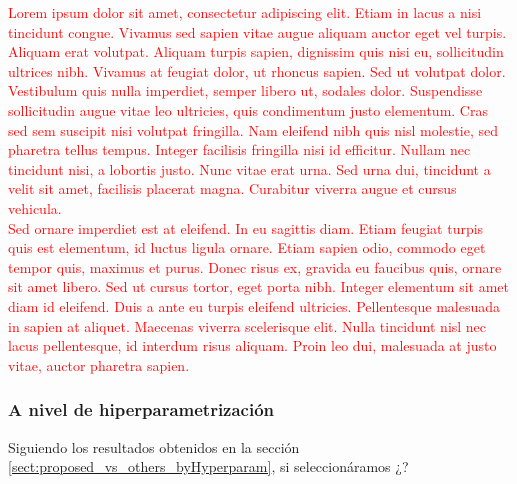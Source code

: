 \documentclass[print, color]{ugrTFG}
\begin{document}
\textcolor{red}{
 Lorem ipsum dolor sit amet, consectetur adipiscing elit. Etiam in lacus a nisi tincidunt congue. Vivamus sed sapien vitae augue aliquam auctor eget vel turpis. Aliquam erat volutpat. Aliquam turpis sapien, dignissim quis nisi eu, sollicitudin ultrices nibh. Vivamus at feugiat dolor, ut rhoncus sapien. Sed ut volutpat dolor. Vestibulum quis nulla imperdiet, semper libero ut, sodales dolor. Suspendisse sollicitudin augue vitae leo ultricies, quis condimentum justo elementum. Cras sed sem suscipit nisi volutpat fringilla. Nam eleifend nibh quis nisl molestie, sed pharetra tellus tempus. Integer facilisis fringilla nisi id efficitur. Nullam nec tincidunt nisi, a lobortis justo. Nunc vitae erat urna. Sed urna dui, tincidunt a velit sit amet, facilisis placerat magna. Curabitur viverra augue et cursus vehicula.\\ 
Sed ornare imperdiet est at eleifend. In eu sagittis diam. Etiam feugiat turpis quis est elementum, id luctus ligula ornare. Etiam sapien odio, commodo eget tempor quis, maximus et purus. Donec risus ex, gravida eu faucibus quis, ornare sit amet libero. Sed ut cursus tortor, eget porta nibh. Integer elementum sit amet diam id eleifend. Duis a ante eu turpis eleifend ultricies. Pellentesque malesuada in sapien at aliquet. Maecenas viverra scelerisque elit. Nulla tincidunt nisl nec lacus pellentesque, id interdum risus aliquam. Proin leo dui, malesuada at justo vitae, auctor pharetra sapien.
}\\ \newline


 \subsubsection{A nivel de hiperparametrización}
 Siguiendo los resultados obtenidos en la sección \ref{sect:proposed_vs_others_byHyperparam}, si seleccionáramos ¿? 
\end{document}
